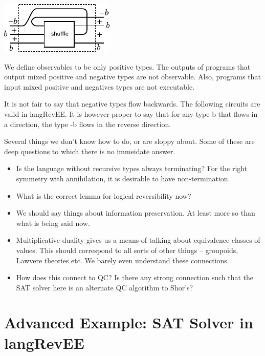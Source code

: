 \documentclass[preprint]{sigplanconf}
\begin{document}
\begin{center}
  \includegraphics{diagrams/shuffle.pdf}
\end{center}

We define observables to be only positive types. The outputs of
programs that output mixed positive and negative types are not
observable.  Also, programs that input mixed positive and negatives
types are not executable.

It is not fair to say that negative types flow backwards. The
following circuits are valid in {{langRevEE}}. It is however proper to
say that for any type {{b}} that flows in a direction, the type {{-b}}
flows in the reverse direction.

Several things we don't know how to do, or are sloppy about. Some of
these are deep questions to which there is no immeidate answer.

\begin{itemize}

\item Is the language without recursive types always terminating? For
  the right symmetry with annihilation, it is desirable to have
  non-termination.

\item What is the correct lemma for logical reversibility now?

\item We should say things about information preservation. At least
  more so than what is being said now.


\item Multiplicative duality gives us a means of talking about
  equivalence classes of values. This should correspond to all sorts
  of other things -- groupoids, Lawvere theories etc. We barely even
  understand these connections.

\item How does this connect to QC? Is there any strong connection such
  that the SAT solver here is an alternate QC algorithm to Shor's?

\end{itemize}


\section{Advanced Example: SAT Solver in {{langRevEE}} }
\label{sec:prog}
\label{sec:sat-solver}
\end{document}

